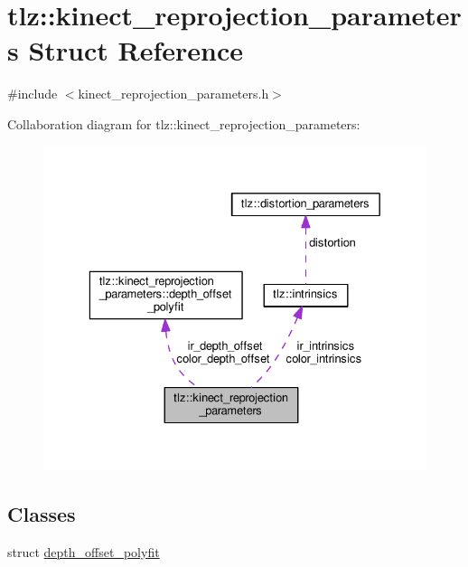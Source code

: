 \hypertarget{structtlz_1_1kinect__reprojection__parameters}{}\section{tlz\+:\+:kinect\+\_\+reprojection\+\_\+parameters Struct Reference}
\label{structtlz_1_1kinect__reprojection__parameters}


{\ttfamily \#include $<$kinect\+\_\+reprojection\+\_\+parameters.\+h$>$}



Collaboration diagram for tlz\+:\+:kinect\+\_\+reprojection\+\_\+parameters\+:
\nopagebreak
\begin{figure}[H]
\begin{center}
\leavevmode
\includegraphics[width=329pt]{structtlz_1_1kinect__reprojection__parameters__coll__graph}
\end{center}
\end{figure}
\subsection*{Classes}
\begin{DoxyCompactItemize}
\item 
struct \hyperlink{structtlz_1_1kinect__reprojection__parameters_1_1depth__offset__polyfit}{depth\+\_\+offset\+\_\+polyfit}
\end{DoxyCompactItemize}
